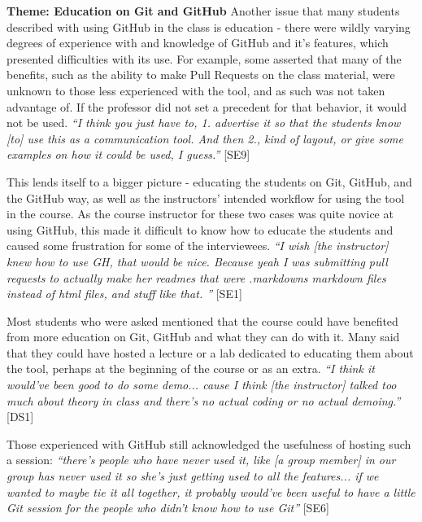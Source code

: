 \textbf{Theme: Education on Git and GitHub} \break
Another issue that many students described with using GitHub in the class is education - there were wildly varying degrees of experience with and knowledge of GitHub and it's features, which presented difficulties with its use. For example, some asserted that many of the benefits, such as the ability to make Pull Requests on the class material, were unknown to those less experienced with the tool, and as such was not taken advantage of. If the professor did not set a precedent for that behavior, it would not be used. \textit{``I think you just have to, 1. advertise it so that the students know [to] use this as a communication tool. And then 2., kind of layout, or give some examples on how it could be used, I guess.''} [SE9]

This lends itself to a bigger picture - educating the students on Git, GitHub, and the GitHub way, as well as the instructors' intended workflow for using the tool in the course. As the course instructor for these two cases was quite novice at using GitHub, this made it difficult to know how to educate the students and caused some frustration for some of the interviewees. \textit{``I wish [the instructor] knew how to use GH, that would be nice. Because yeah I was submitting pull requests to actually make her readmes that were .markdowns markdown files instead of html files, and stuff like that. ''} [SE1]

Most students who were asked mentioned that the course could have benefited from more education on Git, GitHub and what they can do with it. Many said that they could have hosted a lecture or a lab dedicated to educating them about the tool, perhaps at the beginning of the course or as an extra. \textit{``I think it would've been good to do some demo... cause I think [the instructor] talked too much about theory in class and there's no actual coding or no actual demoing.''} [DS1]

Those experienced with GitHub still acknowledged the usefulness of hosting such a session: \textit{``there's people who have never used it, like [a group member] in our group has never used it so she's just getting used to all the features... if we wanted to maybe tie it all together, it probably would've been useful to have a little Git session for the people who didn't know how to use Git''} [SE6]


